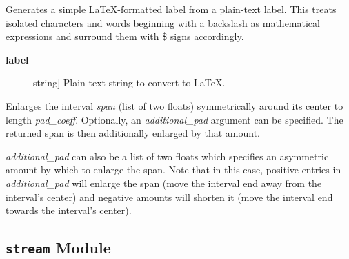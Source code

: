 \documentclass[a4paper,10pt,english]{sphinxmanual}
\begin{document}

\begin{fulllineitems}
\label{index:kafe.plot.label_to_latex}
Generates a simple LaTeX-formatted label from a plain-text label.
This treats isolated characters and words beginning with a backslash
as mathematical expressions and surround them with \$ signs accordingly.
\begin{description}
\item[{\textbf{label}}] \leavevmode{[}string{]}
Plain-text string to convert to LaTeX.

\end{description}

\end{fulllineitems}


\begin{fulllineitems}
\label{index:kafe.plot.pad_span}
Enlarges the interval \emph{span} (list of two floats) symmetrically around
its center to length \emph{pad\_coeff}. Optionally, an \emph{additional\_pad} argument
can be specified. The returned span is then additionally enlarged by that
amount.

\emph{additional\_pad} can also be a list of two floats which specifies an
asymmetric amount by which to enlarge the span. Note that in this case,
positive entries in \emph{additional\_pad} will enlarge the span (move the
interval end away from the interval's center) and negative amounts will
shorten it (move the interval end towards the interval's center).

\end{fulllineitems}



\subsection{\texttt{stream} Module}
\label{index:stream-module}\label{index:module-kafe.stream}\label{index:module-stream}
\end{document}
